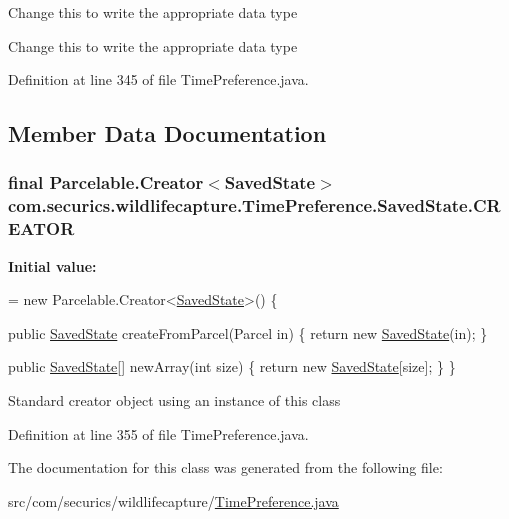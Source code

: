 Change this to write the appropriate data type

Change this to write the appropriate data type 

Definition at line 345 of file Time\+Preference.\+java.



\subsection{Member Data Documentation}
\hypertarget{classcom_1_1securics_1_1wildlifecapture_1_1_time_preference_1_1_saved_state_a88689bd7248417c21799b607bf25c2dd}{
\subsubsection[{C\+R\+E\+A\+T\+O\+R}]{\setlength{\rightskip}{0pt plus 5cm}final Parcelable.\+Creator$<${\bf Saved\+State}$>$ com.\+securics.\+wildlifecapture.\+Time\+Preference.\+Saved\+State.\+C\+R\+E\+A\+T\+O\+R\hspace{0.3cm}{\ttfamily [static]}}}\label{classcom_1_1securics_1_1wildlifecapture_1_1_time_preference_1_1_saved_state_a88689bd7248417c21799b607bf25c2dd}
{\bfseries Initial value\+:}
\begin{DoxyCode}
= \textcolor{keyword}{new} Parcelable.Creator<\hyperlink{classcom_1_1securics_1_1wildlifecapture_1_1_time_preference_1_1_saved_state_a99fd66552ded31ee628ea13829e4459a}{SavedState}>() \{

            \textcolor{keyword}{public} \hyperlink{classcom_1_1securics_1_1wildlifecapture_1_1_time_preference_1_1_saved_state_a99fd66552ded31ee628ea13829e4459a}{SavedState} createFromParcel(Parcel in) \{
                \textcolor{keywordflow}{return} \textcolor{keyword}{new} \hyperlink{classcom_1_1securics_1_1wildlifecapture_1_1_time_preference_1_1_saved_state_a99fd66552ded31ee628ea13829e4459a}{SavedState}(in);
            \}

            \textcolor{keyword}{public} \hyperlink{classcom_1_1securics_1_1wildlifecapture_1_1_time_preference_1_1_saved_state_a99fd66552ded31ee628ea13829e4459a}{SavedState}[] newArray(\textcolor{keywordtype}{int} size) \{
                \textcolor{keywordflow}{return} \textcolor{keyword}{new} \hyperlink{classcom_1_1securics_1_1wildlifecapture_1_1_time_preference_1_1_saved_state_a99fd66552ded31ee628ea13829e4459a}{SavedState}[size];
            \}
        \}
\end{DoxyCode}
Standard creator object using an instance of this class 

Definition at line 355 of file Time\+Preference.\+java.



The documentation for this class was generated from the following file\+:\begin{DoxyCompactItemize}
\item 
src/com/securics/wildlifecapture/\hyperlink{_time_preference_8java}{Time\+Preference.\+java}\end{DoxyCompactItemize}
